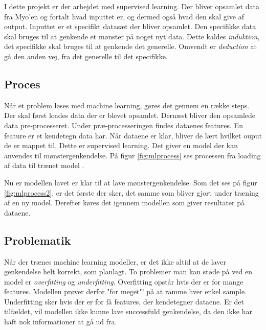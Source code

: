 I dette projekt er der arbejdet med supervised learning. Der bliver opsamlet data fra Myo'en og fortalt hvad inputtet er, og dermed også hvad den skal give af output. Inputtet er et specifikt datasæt der bliver opsamlet. Den specifikke data skal bruges til at genkende et mønster på noget nyt data. Dette kaldes \textit{induktion}, det specifikke skal bruges til at genkende det generelle. Omvendt er \textit{deduction} at gå den anden vej, fra det generelle til det specifikke.

\subsection{Proces}
Når et problem løses med machine learning, gøres det gennem en række steps. Der skal først loades data der er blevet opsamlet. Dernæst bliver den opsamlede data pre-processeret. Under præ-processeringen findes dataenes features. En feature er et kendetegn data har. Når dataene er klar, bliver de lært hvilket ouput de er mappet til. Dette er supervised learning. Det giver en model der kan anvendes til mønstergenkendelse. På figur \ref{fig:mlprocess} ses processen fra loading af data til trænet model \citep{MLMadeEasy}.


Nu er modellen lavet er klar til at lave mønstergenkendelse. Som det ses på figur \ref{fig:mlprocess2}, er det første der sker, det samme som bliver gjort under træning af en ny model. Derefter køres det igennem modellen som giver resultater på dataene.


\subsection{Problematik}
Når der trænes machine learning modeller, er det ikke altid at de laver genkendelse helt korrekt, som planlagt. To problemer man kan støde på ved en model er \textit{overfitting} og \textit{underfitting}. Overfitting opstår hvis der er for mange features. Modellen prøver derfor "for meget"' på at ramme hver enkel sample. Underfitting sker hvis der er for få features, der kendetegner dataene. Er det tilfældet, vil modellen ikke kunne lave successfuld genkendelse, da den ikke har haft nok informationer at gå ud fra.

